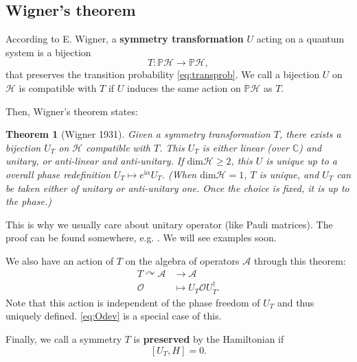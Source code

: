 \documentclass[
]{scrartcl}
\numberwithin{equation}{section}
\renewenvironment{align}{\begin{equation}\begin{aligned}}{\end{aligned}\end{equation}}
\newtheorem{theorem}{Theorem}[section]
\theoremstyle{definition}
\theoremstyle{definition}
\theoremstyle{definition}
\theoremstyle{definition}
\theoremstyle{remark}
\begin{document}
\hypertarget{wigners-theorem}{%
\subsection{Wigner's theorem}\label{wigners-theorem}}

According to E. Wigner, a \textbf{symmetry transformation} \(U\) acting on a quantum system is a bijection
\begin{equation}
  \label{eq:sym}
  T: \mathbb{P}\mathcal{H} \to \mathbb{P}\mathcal{H},
\end{equation}
that preserves the transition probability \eqref{eq:transprob}.
We call a bijection \(U\) on \(\mathcal{H}\) is compatible with \(T\) if \(U\) induces the same action on \(\mathbb{P}\mathcal{H}\) as \(T\).

Then, Wigner's theorem states:

\begin{theorem}[Wigner 1931]
Given a symmetry transformation \(T\), there exists a bijection \(U_T\) on \(\mathcal{H}\) compatible with \(T\).
This \(U_T\) is either linear (over \(\mathbb{C}\)) and unitary, or anti-linear and anti-unitary. If \(\mathrm{dim}\mathcal{H}\ge 2\), this \(U\) is unique up to a overall phase redefinition \(U_T \mapsto e^{\mathrm{i}\alpha}U_T\). (When \(\mathrm{dim}\mathcal{H} = 1\), \(T\) is unique, and \(U_T\) can be taken either of unitary or anti-unitary one. Once the choice is fixed, it is up to the phase.)
\end{theorem}

This is why we usually care about unitary operator (like Pauli matrices).
The proof can be found somewhere, e.g. \textcite{Weinberg:1995mt}. We will see examples soon.

We also have an action of \(T\) on the algebra of operators \(\mathcal{A}\) through this theorem:
\begin{align}
  \label{eq:TonA}
  T \curvearrowright \mathcal{A}  & \to \mathcal{A} \\
  \mathcal{O} & \mapsto U_T \mathcal{O} U^\dagger_T.
\end{align}
Note that this action is independent of the phase freedom of \(U_T\) and thus uniquely defined.
\eqref{eq:Odev} is a special case of this.

Finally, we call a symmetry \(T\) is \textbf{preserved} by the Hamiltonian if
\begin{equation}
  \label{eq:UHcommute}
  [U_T,H] = 0.
\end{equation}
\end{document}
